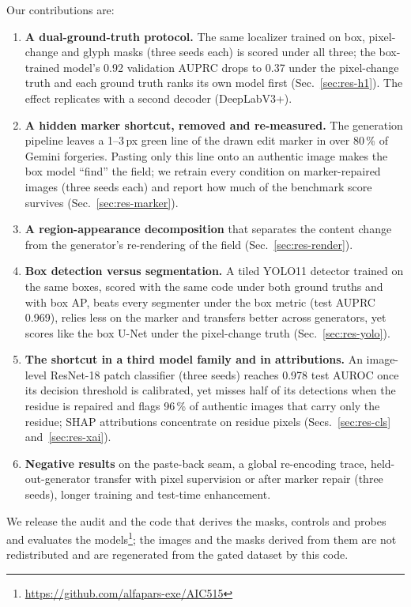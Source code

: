 Our contributions are:
\begin{enumerate}
\item \textbf{A dual-ground-truth protocol.} The same localizer trained on box, pixel-change and glyph masks (three seeds each) is scored under all three; the box-trained model's 0.92 validation AUPRC drops to 0.37 under the pixel-change truth and each ground truth ranks its own model first (Sec.~\ref{sec:res-h1}). The effect replicates with a second decoder (DeepLabV3+).
\item \textbf{A hidden marker shortcut, removed and re-measured.} The generation pipeline leaves a 1--3\,px green line of the drawn edit marker in over 80\,\% of Gemini forgeries. Pasting only this line onto an authentic image makes the box model ``find'' the field; we retrain every condition on marker-repaired images (three seeds each) and report how much of the benchmark score survives (Sec.~\ref{sec:res-marker}).
\item \textbf{A region-appearance decomposition} that separates the content change from the generator's re-rendering of the field (Sec.~\ref{sec:res-render}).
\item \textbf{Box detection versus segmentation.} A tiled YOLO11 detector trained on the same boxes, scored with the same code under both ground truths and with box AP, beats every segmenter under the box metric (test AUPRC 0.969), relies less on the marker and transfers better across generators, yet scores like the box U-Net under the pixel-change truth (Sec.~\ref{sec:res-yolo}).
\item \textbf{The shortcut in a third model family and in attributions.} An image-level ResNet-18 patch classifier (three seeds) reaches 0.978 test AUROC once its decision threshold is calibrated, yet misses half of its detections when the residue is repaired and flags 96\,\% of authentic images that carry only the residue; SHAP attributions concentrate on residue pixels (Secs.~\ref{sec:res-cls} and~\ref{sec:res-xai}).
\item \textbf{Negative results} on the paste-back seam, a global re-encoding trace, held-out-generator transfer with pixel supervision or after marker repair (three seeds), longer training and test-time enhancement.
\end{enumerate}
We release the audit and the code that derives the masks, controls and probes and evaluates the models\footnote{\url{https://github.com/alfapars-exe/AIC515}}; the images and the masks derived from them are not redistributed and are regenerated from the gated dataset by this code.
